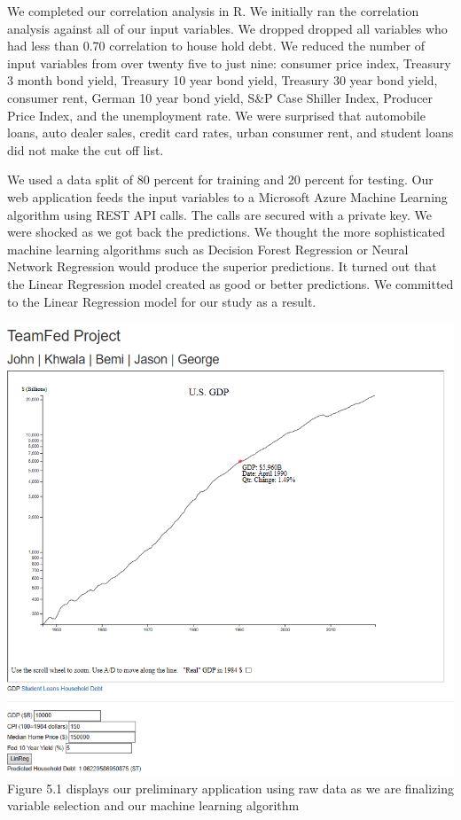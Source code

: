 \documentclass[sigconf,nonacm,11pt]{acmart}
\begin{document}
We completed our correlation analysis in R. We initially ran the correlation analysis against all of our input variables.   We dropped dropped all variables who had less than 0.70 correlation to house hold debt. We reduced the number of input variables from over twenty five to just nine:  consumer price index, Treasury 3 month bond yield, Treasury 10 year bond yield, Treasury 30 year bond yield, consumer rent, German 10 year bond yield, S&P Case Shiller Index, Producer Price Index, and the unemployment rate. We were surprised that automobile loans, auto dealer sales, credit card rates, urban consumer rent, and student loans did not make the cut off list.

We used a data split of 80 percent for training and 20 percent for testing. Our web application feeds the input variables to a Microsoft Azure Machine Learning algorithm using REST API calls. The calls are secured with a private key.  We were shocked as we got back the predictions.  We thought the more sophisticated machine learning algorithms such as Decision Forest Regression or Neural Network Regression would produce the superior predictions. It turned out that the Linear Regression model created as good or better predictions.  We committed to the Linear Regression model for our study as a result.

\includegraphics[scale = 0.59]{teamfed2.PNG}
Figure 5.1 displays our preliminary application using raw data as we are finalizing variable selection and our machine learning algorithm \vspace{-0.5em}
\end{document}
